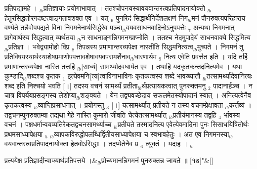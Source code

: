 \documentclass[article,12pt,a4paper]{memoir}%
\newcounter{parCount}
\begin{document}
प्रतिपद्यामहे । {\tiny $_{lb}$}प्रतिज्ञायाः प्रयोगाभावात् । ततश्चोपनयस्यावयवान्तरत्वप्रतिपादनायोक्तो {\tiny $_{lb}$}हेतुरसिद्धतोरगदष्टत्वाङ्गतावशक्त एव । यत् {\tiny $_{6}$} पुनरिदं सिद्धार्थनिर्देशलक्षणं निग{\tiny $_{lb}$}मनं पौनरुक्त्यपरिहाराय वर्ण्यते तन्नैवोपपद्यते विना निगमनेनार्थसिद्धेरेव पञ्चा{\tiny $_{lb}$}वयवसाधनवादिनोऽनुपपत्तेः {\tiny $_{7}$} अन्यथा निगमनात् प्रागेवार्थस्य सिद्धत्वात् व्यर्थतया {\tiny $_{lb}$}न साधनाङ्गन्निगमनम्प्राप्नोति । ततश्च नेदमुपादेयं साधनवाक्ये सिद्धमित्य{\tiny $_{lb}$}प्रतिज्ञा । भवेद्व्यामोहो विप्र {\tiny $_{8}$} तिपन्नस्य प्रमाणान्तरव्यपेक्षा नास्तीति सिद्धमनित्यत्व{\tiny $_{lb}$}मुच्यते । निगमनं तु प्रतिविषयस्यार्थस्याशेषप्रमाणोपपत्तावशेषावयवपरामर्शेनाव{\tiny $_{lb}$}धारणार्थम {\tiny $_{9}$} \leavevmode{} नित्य एवेति प्रवर्त्तत इति । यदि तर्हि प्रमाणान्तरव्यपेक्षा नास्ति तत्तर्हि {\tiny $_{lb}$}[साध्यं] सामर्थ्यादवधार्यत एव । तथाहि यदकृतकन्तदनित्यमेव । यथा कुण्डादि{\tiny $_{lb}$}शब्दश्च कृतक {\tiny $_{1}$} इत्येवमनि[त्य]त्वाविनाभाविनः कृतकत्वस्य शब्दे भावख्यातौ {\tiny $_{lb}$}तत्सामर्थ्यादेवानित्यः शब्द इति निश्चयो भवति [।] तदस्य वचनं सामर्थ्यं प्रतीता{\tiny $_{lb}$}र्थप्रत्यायकत्वात् पुनरुक्तमनु {\tiny $_{2}$} पादानार्हञ्च । न चात्र विपर्ययप्रसङ्गस्य लेशोप्या{\tiny $_{lb}$}शङ्क्यते । येन तद्व्यवच्छेदाय सफलमेतस्योपादानं स्यात् । अनित्यत्वेनैव कृतकत्वस्य {\tiny $_{lb}$}व्याप्तिप्रसाधनात् । प्रयोगस्तु {\tiny $_{3}$} [।] यत्सामर्थ्यात् प्रतीयते न तस्य वचनम्प्रेक्षावता {\tiny $_{lb}$}कर्त्तव्यं । तद्वचनम्पुनरुक्तम्वा तद्यथा गेहे नास्ति कुमारो जीवति चेत्येतत्सामर्थ्यात् {\tiny $_{lb}$}प्रतीयंमानस्य तद्वहि {\tiny $_{4}$} र्भावस्य वचनं । पक्षधर्मान्वयव्यतिरेकतद्वचनसामर्थ्याच्च {\tiny $_{lb}$}प्रतीयते तस्मादनित्य एवेत्येवमादिना पुनः सिसाधयिषितोर्थः प्रथमसाध्यापेक्षया {\tiny $_{5}$} {\tiny $_{lb}$}व्यापकविरुद्धोपलब्धिर्द्वितीयसाध्यापेक्षया च स्वभावहेतुः । अत एव निगमनस्या{\tiny $_{lb}$}वयवान्तरत्वप्रतिपादनायोक्ता हेतवोऽसिद्धाः । तदप्येतेनैव प्र {\tiny $_{6}$} त्युक्तं । यदाह ।
	{}
	\pend%
      {\tiny $_{lb}$}
	  \bigskip
	  \begingroup
	
	    
	    \stanza[\smallbreak]
	  प्रत्ययेक्ष  प्रतिज्ञादीन्वाक्यार्थप्रतिपत्तये ।&{\tiny $_{lb}$}\leavevmode{}प्रोच्यमानन्निगमनं पुनरुक्तन्न जायते ॥ [१७]{\normalfontlatin\large\qquad{}"}\&[\smallbreak]
	  
\end{document}
